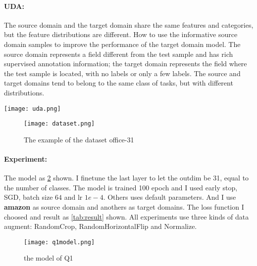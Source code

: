 \documentclass[10pt,twocolumn,letterpaper]{article}
\begin{document}
\paragraph{UDA:}
The source domain and the target domain share the same features and categories, but the feature distributions are different. How to use the informative source domain samples to improve the performance of the target domain model. The source domain represents a field different from the test sample and has rich supervised annotation information; the target domain represents the field where the test sample is located, with no labels or only a few labels. The source and target domains tend to belong to the same class of tasks, but with different distributions.
\begin{figure*}[ht]
    \centering 
    \texttt{[image: uda.png]} 
    \caption{An Overview of Different Settings of Transfer\cite{pan2009survey}.}
    \label{fig:uda} 
\end{figure*}
\begin{figure}[ht]
    \centering 
    \texttt{[image: dataset.png]} 
    \caption{The example of the dataset office-31}
    \label{fig:dataset} 
\end{figure}
\paragraph{Experiment:}
The model as \cref{fig:q1} shown.
I finetune the last layer to let the outdim be 31, equal to the number of classes.
The model is trained 100 epoch and I used early stop, SGD, batch size $64$ and lr  $1e-4$. Others uses default parameters.
And I use \textbf{amazon} as source domain and anothers as target domains. The loss function I choosed and result as \cref{tab:result} shown. 
All experiments use three kinds of data augment: RandomCrop, RandomHorizontalFlip and Normalize.
\begin{figure}[ht]
    \centering 
    \texttt{[image: q1model.png]} 
    \caption{the model of Q1}
    \label{fig:q1} 
\end{figure}
\end{document}
